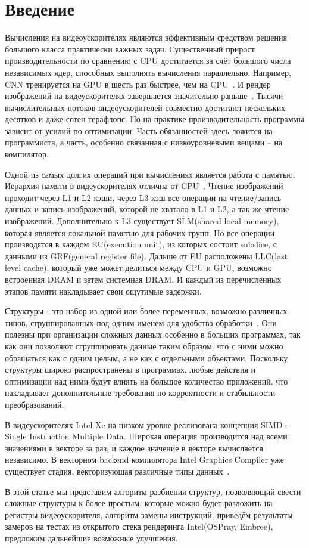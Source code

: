 \section{Введение}
\label{sec:Introduction}
Вычисления на видеоускорителях являются эффективным средством решения большого класса практически важных задач. 
Существенный прирост производительности по сравнению с CPU достигается за счёт большого числа независимых ядер, способных выполнять вычисления параллельно.
Например, CNN тренируется на GPU в шесть раз быстрее, чем на CPU~\cite{render}. И рендер изображений на видеускорителях завершается значительно раньше~\cite{render}.
Тысячи вычислительных потоков видеоускорителей совместно достигают нескольких десятков и даже сотен терафлопс. Но на практике производительность программы зависит от усилий по оптимизации.
Часть обязанностей здесь ложится на программиста, а часть, особенно связанная с низкоуровневыми вещами -- на компилятор.

Одной из самых долгих операций при вычислениях является работа с памятью. 
Иерархия памяти в видеускорителях отлична от CPU~\cite{MEM}.
Чтение изображений проходит через L1 и L2 кэши, через L3-кэш все операции на чтение/запись данных и запись изображений, которой не хватало в L1 и L2, а так же чтение изображений.
Дополнительно к L3 существует SLM(shared local memory), которая является локальной памятью для рабочих групп.
Но все операции производятся в каждом EU(execution unit), из которых состоит subslice, с данными из GRF(general register file).
Дальше от EU расположены LLC(last level cache), который уже может делиться между CPU и GPU, возможно встроенная DRAM и затем системная DRAM.
И каждый из перечисленных этапов памяти накладывает свои ощутимые задержки.

Структуры - это набор из одной или более переменных, возможно различных типов, сгруппированных под одним именем для удобства обработки~\cite{Kern}.
Они полезны при организации сложных данных особенно в больших программах, так как они позволяют сгруппировать данные таким образом, что с ними можно обращаться как с одним целым, а не как с отдельными объектами.
Поскольку структуры широко распространены в программах, любые действия и оптимизации над ними будут влиять на большое количество приложений, что накладывает дополнительные требования по корректности и стабильности преобразований.

В видеускорителях Intel Xe на низком уровне реализована концепция SIMD - Single Instruction Multiple Data.
Широкая операция производится над всеми значениями в векторе за раз, и каждое значение в векторе вычисляется независимо.
В векторном backend компилятора Intel Graphics Compiler уже существует стадия, векторизующая различные типы данных~\cite{KEN}.

В этой статье мы представим алгоритм разбиения структур, позволяющий свести сложные структуры к более простым, которые можно будет разложить на регистры видеоускорителя, алгоритм замены инструкций, приведём результаты замеров на тестах из открытого стека рендеринга Intel(OSPray, Embree), предложим дальнейшие возможные улучшения.
